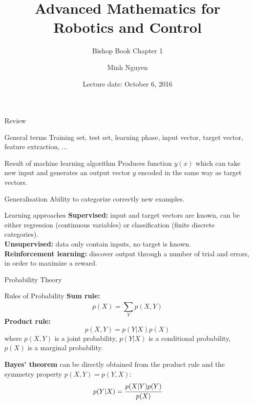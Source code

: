 \documentclass[9pt]{beamer}
\title{Advanced Mathematics for Robotics and Control}
\subtitle{Bishop Book Chapter 1}
\date{Lecture date: October 6, 2016}
\author{Minh Nguyen}
\begin{document}
\maketitle

\begin{frame}{Review}
    \begin{alertblock}{General terms}
        Training set, test set, learning phase, input vector, target vector, feature extraction, ...
    \end{alertblock}
    \begin{alertblock}{Result of machine learning algorithm}
        Produces function $y(x)$ which can take new input and generates an output vector $y$ encoded in the same way as target vectors.
    \end{alertblock}
    \begin{alertblock}{Generalisation}
        Ability to categorize correctly new examples.
    \end{alertblock}
    \begin{alertblock}{Learning approaches}
        \textbf{Supervised:} input and target vectors are known, can be either regression (continuous variables) or classification (finite discrete categories).\\
        \textbf{Unsupervised:} data only contain inputs, no target is known.\\
        \textbf{Reinforcement learning:} discover output through a number of trial and errors, in order to maximize a reward.
    \end{alertblock}
\end{frame}

\begin{frame}{Probability Theory}
    \begin{alertblock}{Rules of Probability}
        \textbf{Sum rule:}
        \[ p(X) = \sum_{Y}^{} p(X, Y) \]
        \textbf{Product rule:}
        \[ p(X, Y) = p(Y | X) p(X) \]
        where $p(X, Y)$ is a joint probability, $p(Y | X)$ is a conditional probability, $p(X)$ is a marginal probability.

        \textbf{Bayes' theorem} can be directly obtained from the product rule and the symmetry property $p(X,Y) = p(Y,X)$:
        \[ p(Y | X) = \cfrac{p(X|Y) p(Y)}{p(X)} \]
    \end{alertblock}
\end{frame}
\end{document}
